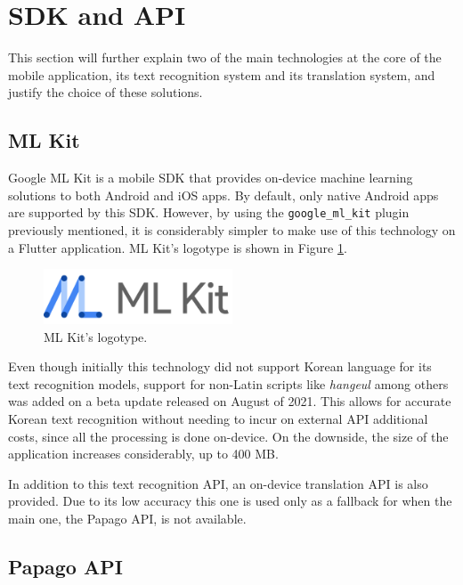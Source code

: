 \section{SDK and API}

This section will further explain two of the main technologies at the core of the mobile application, its text recognition system and its translation system, and justify the choice of these solutions.

\subsection{ML Kit}

Google ML Kit \cite{noauthor_ml_nodate} is a mobile SDK that provides on-device machine learning solutions to both Android and iOS apps. By default, only native Android apps are supported by this SDK. However, by using the \texttt{google\_ml\_kit} plugin previously mentioned, it is considerably simpler to make use of this technology on a Flutter application. ML Kit's logotype is shown in Figure \ref{fig:ml-kit}.

\begin{figure}[h]
  \centering
  \includegraphics[width=0.5\textwidth]{Figures/ml-kit.png}
  \caption{%
    ML Kit's logotype.
  }
  \label{fig:ml-kit}
\end{figure}

Even though initially this technology did not support Korean language for its text recognition models, support for non-Latin scripts like \textit{hangeul} among others was added on a beta update released on August of 2021. This allows for accurate Korean text recognition without needing to incur on external API additional costs, since all the processing is done on-device. On the downside, the size of the application increases considerably, up to 400 MB.

In addition to this text recognition API, an on-device translation API is also provided. Due to its low accuracy this one is used only as a fallback for when the main one, the Papago API, is not available.

\subsection{Papago API}

